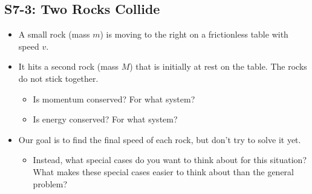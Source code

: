 \documentclass[]{article}
\begin{document}
\begin{PresentSpace}
\vspace{-10pt}
\section*{S7-3: Two Rocks Collide}
\vspace{-10pt}
\begin{itemize}
	\item A small rock (mass $m$) is moving to the right on a frictionless table with speed $v$.
	\item It hits a second rock (mass $M$) that is initially at rest on the table. The rocks do not stick together.
	\begin{itemize}
		\item Is momentum conserved? For what system?
		\item Is energy conserved? For what system?
	\end{itemize}
	\item Our goal is to find the final speed of each rock, but don't try to solve it yet.
	\begin{itemize}
		\item Instead, what special cases do you want to think about for this situation? What makes these special cases easier to think about than the general problem?
	\end{itemize}
\end{itemize}
\end{PresentSpace}
\newpage
\begin{TeacherMargin}
\begin{multicols}{2}
\CollRockCalc
\CollRockSense
\end{multicols}
\end{TeacherMargin}
\end{document}
